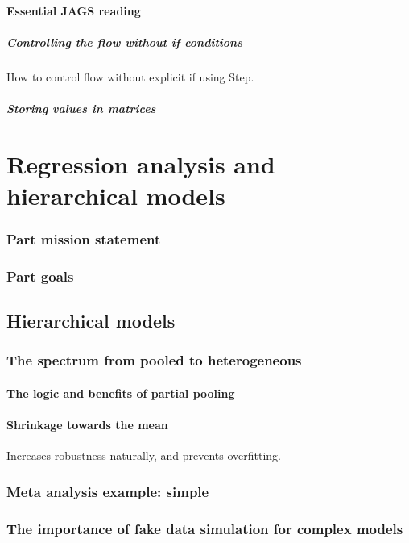 \documentclass[11pt,fullpage]{book}
\begin{document}
\subsection{Essential JAGS reading}
\subsubsection{Controlling the flow without if conditions}
How to control flow without explicit if using Step.
\subsubsection{Storing values in matrices}


\part{Regression analysis and hierarchical models}\label{part:regressionHierarchical}
\section{Part mission statement}
\section{Part goals}

\chapter{Hierarchical models}\label{chap:hierarchicalModels}
\section{The spectrum from pooled to heterogeneous}
\subsection{The logic and benefits of partial pooling}
\subsection{Shrinkage towards the mean}
Increases robustness naturally, and prevents overfitting.

\section{Meta analysis example: simple}

\section{The importance of fake data simulation for complex models}
\end{document}
